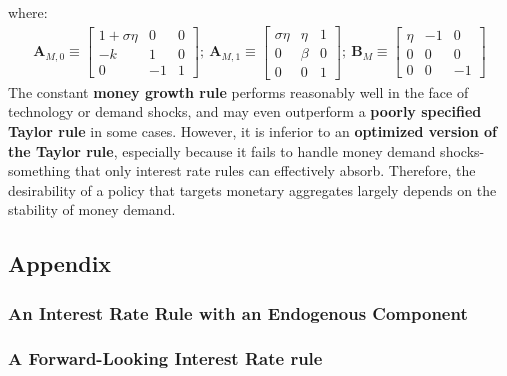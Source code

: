 \documentclass{article}
\numberwithin{equation}{section}
\begin{document}
where:
	\begin{align*}
		\textbf{A}_{M,0} \equiv \begin{bmatrix}
									1 + \sigma\eta & 0 & 0\\
									-k & 1 & 0\\
									0 & -1 & 1
								\end{bmatrix};\
		\textbf{A}_{M,1} \equiv \begin{bmatrix}
									\sigma\eta & \eta & 1\\
									0 & \beta & 0\\
									0 & 0 & 1
								\end{bmatrix};\
		\textbf{B}_{M} \equiv   \begin{bmatrix}
									\eta & -1 & 0\\
									0 & 0 & 0\\
									0 & 0 & -1
								\end{bmatrix}
	\end{align*} 
The constant \textbf{money growth rule} performs reasonably well in the face of technology or demand shocks, and may even outperform a \textbf{poorly specified Taylor rule} in some cases. However, it is inferior to an \textbf{optimized version of the Taylor rule}, especially because it fails to handle money demand shocks-something that only interest rate rules can effectively absorb. Therefore, the desirability of a policy that targets monetary aggregates largely depends on the stability of money demand.




\newpage
\subsection{Appendix}
\subsubsection{An Interest Rate Rule with an Endogenous Component}

\subsubsection{A Forward-Looking Interest Rate rule}
\end{document}
